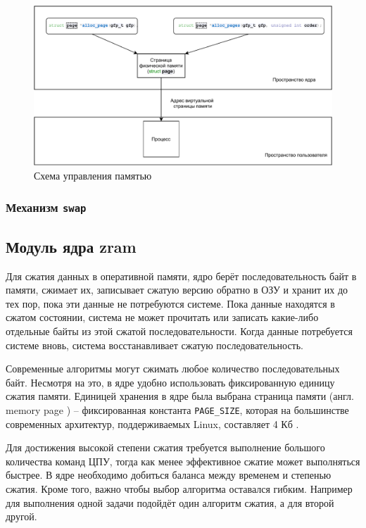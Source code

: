 \begin{figure}[h]
	\centering
	\includegraphics[width=\textwidth]{img/memory_schema.pdf}
	\caption{Схема управления памятью}
	\label{fig:memory_schema}
\end{figure}

\subsubsection{Механизм \texttt{swap}}

\subsection{Модуль ядра zram}

Для сжатия данных в оперативной памяти, ядро берёт последовательность байт в памяти, сжимает их, записывает сжатую версию обратно в ОЗУ и хранит их до тех пор, пока эти данные не потребуются системе. Пока данные находятся в сжатом состоянии, система не может прочитать или записать какие-либо отдельные байты из этой сжатой последовательности. Когда данные потребуется системе вновь, система восстанавливает сжатую последовательность.

Современные алгоритмы могут сжимать любое количество последовательных байт. Несмотря на это, в ядре удобно использовать фиксированную единицу сжатия памяти. Единицей хранения в ядре была выбрана страница памяти (англ. memory page \cite{memory-page}) -- фиксированная константа \texttt{PAGE\_SIZE}, которая на большинстве современных архитектур, поддерживаемых Linux, составляет 4 Кб \cite{4kb-page-size}.

Для достижения высокой степени сжатия требуется выполнение большого количества команд ЦПУ, тогда как менее эффективное сжатие может выполняться быстрее. В ядре необходимо добиться баланса между временем и степенью сжатия. Кроме того, важно чтобы выбор алгоритма оставался гибким. Например для выполнения одной задачи подойдёт один алгоритм сжатия, а для второй другой.


